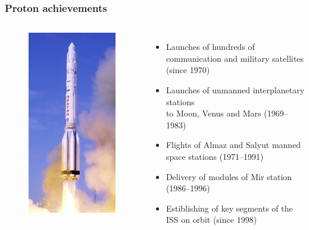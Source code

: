 \documentclass[onlymath]{beamer}
\begin{document}
\begin{frame}
  \frametitle{Proton achievements}
  \begin{columns}
    \begin{figure}
      \centering
      \includegraphics[scale=0.3]{Proton_Zvezda.jpg}
    \end{figure}
    \begin{itemize}
    \item Launches of hundreds of communication and military
      satellites (since 1970)
    \item Launches of unmanned interplanetary stations\\ to Moon,
      Venus and Mars (1969--1983)
    \item Flights of Almaz and Salyut manned space stations
      (1971--1991)
    \item Delivery of modules of Mir station (1986--1996)
    \item Estiblishing of key segments of the ISS 
      on orbit (since 1998)
    \end{itemize}
  \end{columns}

\end{frame}
\end{document}
